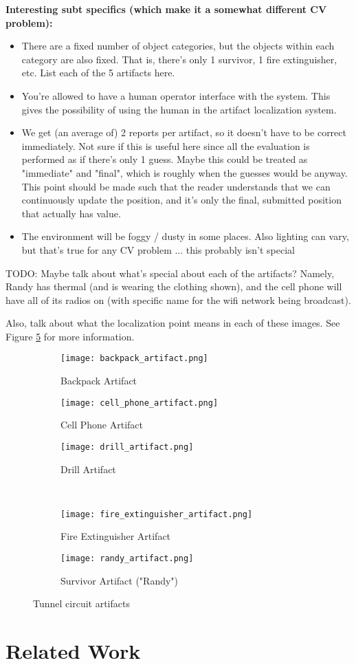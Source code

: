 \textbf{Interesting subt specifics (which make it a somewhat different CV problem):}
\begin{itemize}
	\item There are a fixed number of object categories, but the objects within each category are also fixed. That is, there's only 1 survivor, 1 fire extinguisher, etc. List each of the 5 artifacts here.
	\item You're allowed to have a human operator interface with the system. This gives the possibility of using the human in the artifact localization system.
	\item We get (an average of) 2 reports per artifact, so it doesn't have to be correct immediately. Not sure if this is useful here since all the evaluation is performed as if there's only 1 guess. Maybe this could be treated as "immediate" and "final", which is roughly when the guesses would be anyway. This point should be made such that the reader understands that we can continuously update the position, and it's only the final, submitted position that actually has value.
	\item The environment will be foggy / dusty in some places. Also lighting can vary, but that's true for any CV problem ... this probably isn't special
\end{itemize}

TODO: Maybe talk about what's special about each of the artifacts? Namely, Randy has thermal (and is wearing the clothing shown), and the cell phone will have all of its radios on (with specific name for the wifi network being broadcast).

Also, talk about what the localization point means in each of these images. See Figure \ref{randy} for more information.

\begin{figure}
	\centering
	\begin{subfigure}{0.3\textwidth}
		\texttt{[image: backpack\_artifact.png]}
		\caption{Backpack Artifact}
		\label{backpack}		
	\end{subfigure}
	\hfill
	\begin{subfigure}{0.3\textwidth}
		\texttt{[image: cell\_phone\_artifact.png]}
		\caption{Cell Phone Artifact}
		\label{cell phone}
	\end{subfigure}	
	\hfill
	\begin{subfigure}{0.3\textwidth}
		\texttt{[image: drill\_artifact.png]}
		\caption{Drill Artifact}
		\label{drill}
	\end{subfigure}
	\\
	\begin{subfigure}{0.45\textwidth}
		\texttt{[image: fire\_extinguisher\_artifact.png]}
		\caption{Fire Extinguisher Artifact}
		\label{fire extinguisher}
	\end{subfigure}	
	\hfill
	\begin{subfigure}{0.45\textwidth}
		\texttt{[image: randy\_artifact.png]}
		\caption{Survivor Artifact ("Randy")}
		\label{randy}
	\end{subfigure}	
	\caption{Tunnel circuit artifacts}
	\label{tunnel artifacts}
\end{figure}

\section{Related Work}